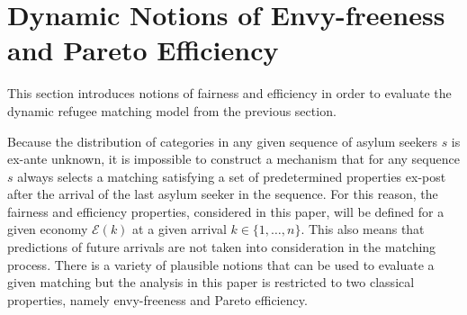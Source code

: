 \documentclass[12pt,fleqn]{article}
\begin{document}
\section{Dynamic Notions of Envy-freeness and Pareto Efficiency}\label{SEC:Fair_Efficient}
This section introduces notions of fairness and efficiency in order to evaluate the dynamic refugee matching model from the previous section.

Because the distribution of categories in any given sequence of asylum seekers $s$ is ex-ante unknown, it is impossible to construct a mechanism that for any sequence $s$ always selects a matching satisfying a set of predetermined properties ex-post after the arrival of the last asylum seeker in the sequence. For this reason, the fairness and efficiency properties, considered in this paper, will be defined for a given economy $\mathcal{E}(k)$ at a given arrival $k\in\{1,\ldots,n\}$. This also means that predictions of future arrivals are not taken into consideration in the matching process. There is a variety of plausible notions that can be used to evaluate a given matching but the analysis in this paper is restricted to two classical properties, namely envy-freeness and Pareto efficiency.
\end{document}
